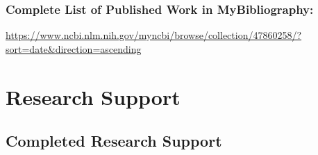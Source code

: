 \documentclass{nihbiosketch}
\begin{document}
\begin{enumerate}


\end{enumerate}

\subsubsection*{Complete List of Published Work in MyBibliography:}
\url{https://www.ncbi.nlm.nih.gov/myncbi/browse/collection/47860258/?sort=date&direction=ascending}





\section{Research Support}

\subsection*{Completed Research Support}
\end{document}
